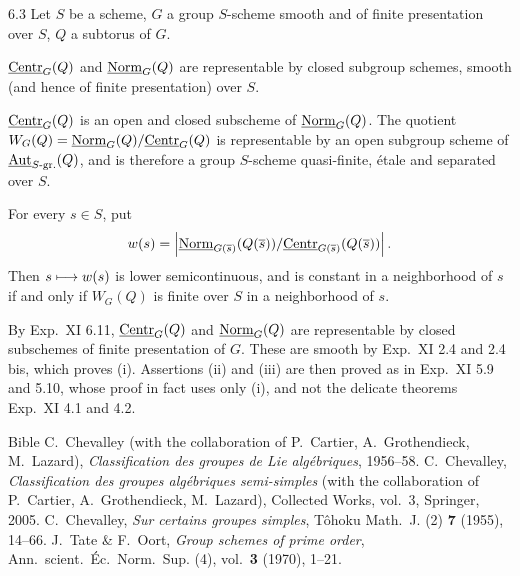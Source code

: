 \begin{proposition}{6.3}\label{XIX.6.3}
Let $S$ be a scheme, $G$ a group $S$-scheme smooth and of finite presentation over $S$, $Q$ a subtorus of $G$.
\begin{enumeratei}
\item $\underline{\mathrm{Centr}}_G(Q)$ and $\underline{\mathrm{Norm}}_G(Q)$ are representable by closed subgroup schemes, smooth (and hence of finite presentation) over $S$.
\item $\underline{\mathrm{Centr}}_G(Q)$ is an open and closed subscheme of $\underline{\mathrm{Norm}}_G(Q)$. The quotient $W_G(Q)=\underline{\mathrm{Norm}}_G(Q)/\underline{\mathrm{Centr}}_G(Q)$ is representable by an open subgroup scheme of $\underline{\operatorname{Aut}}_{S\text{-gr.}}(Q)$, and is therefore a group $S$-scheme quasi-finite, \'etale and separated over $S$.
\item For every $s\in S$, put
\[
w(s)=\left|\underline{\mathrm{Norm}}_{G(\overline{s})}(Q(\overline{s}))/\underline{\mathrm{Centr}}_{G(\overline{s})}(Q(\overline{s}))\right|.
\]
Then $s\longmapsto w(s)$ is lower semicontinuous, and is constant in a neighborhood of $s$ if and only if $W_G(Q)$ is finite over $S$ in a neighborhood of $s$.
\end{enumeratei}
\end{proposition}
By Exp.~XI 6.11, $\underline{\mathrm{Centr}}_G(Q)$ and $\underline{\mathrm{Norm}}_G(Q)$ are representable by closed subschemes of finite presentation of $G$. These are smooth by Exp.~XI 2.4 and 2.4 bis, which proves (i). Assertions (ii) and (iii) are then proved as in Exp.~XI 5.9 and 5.10, whose proof in fact uses only (i), and not the delicate theorems Exp.~XI 4.1 and 4.2.

\begin{thebibliography}{Bible}
 C.~Chevalley (with the collaboration of P.~Cartier, A.~Grothendieck, M.~Lazard), \textit{Classification des groupes de Lie alg\'ebriques}, 1956--58.
 C.~Chevalley, \textit{Classification des groupes alg\'ebriques semi-simples} (with the collaboration of P.~Cartier, A.~Grothendieck, M.~Lazard), Collected Works, vol.~3, Springer, 2005.
 C.~Chevalley, \textit{Sur certains groupes simples}, T\^ohoku Math.~J. (2) \textbf{7} (1955), 14--66.
 J.~Tate \& F.~Oort, \textit{Group schemes of prime order}, Ann.~scient.~\'Ec.~Norm.~Sup. (4), vol.~\textbf{3} (1970), 1--21.
\end{thebibliography}
